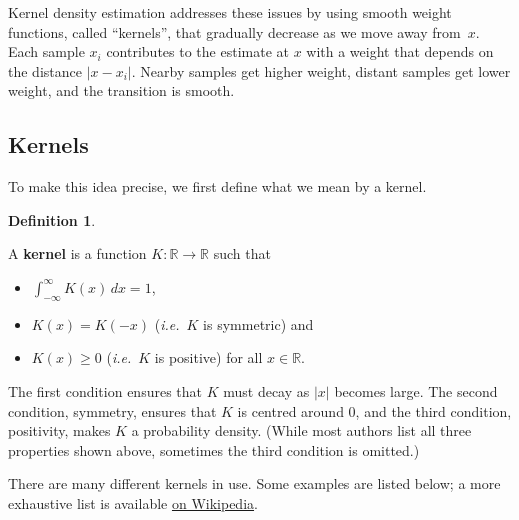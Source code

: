 \documentclass[
  a4paper,
]{article}
\providecommand{\tightlist}{%
  \setlength{\itemsep}{0pt}\setlength{\parskip}{0pt}}
\theoremstyle{definition}
\newtheorem{definition}{Definition}[section]
\theoremstyle{definition}
\theoremstyle{definition}
\theoremstyle{definition}
\theoremstyle{remark}
\begin{document}
Kernel density estimation addresses these issues by using smooth weight
functions, called ``kernels'', that gradually decrease as we move away from~\(x\).
Each sample \(x_i\) contributes to the estimate at \(x\) with a weight that depends
on the distance \(|x - x_i|\). Nearby samples get higher weight, distant samples
get lower weight, and the transition is smooth.

\subsection{Kernels}\label{kernels}

To make this idea precise, we first define what we mean by a kernel.

\begin{definition}
\protect\hypertarget{def:kernel}{}\label{def:kernel}

A \textbf{kernel} is a function \(K\colon \mathbb{R}\to \mathbb{R}\) such that

\begin{itemize}
\tightlist
\item
  \(\int_{-\infty}^\infty K(x) \,dx = 1\),
\item
  \(K(x) = K(-x)\) (\emph{i.e.}~\(K\) is symmetric) and
\item
  \(K(x) \geq 0\) (\emph{i.e.}~\(K\) is positive) for all \(x\in \mathbb{R}\).
\end{itemize}

\end{definition}

The first condition ensures that \(K\) must decay as \(|x|\) becomes large.
The second condition, symmetry, ensures that \(K\) is centred around \(0\),
and the third condition, positivity, makes \(K\) a probability density.
(While most authors list all three properties shown above, sometimes
the third condition is omitted.)

There are many different kernels in use. Some examples are listed
below; a more exhaustive list is available
\href{https://en.wikipedia.org/wiki/Kernel_(statistics)\#Kernel_functions_in_common_use}{on Wikipedia}.
\end{document}
